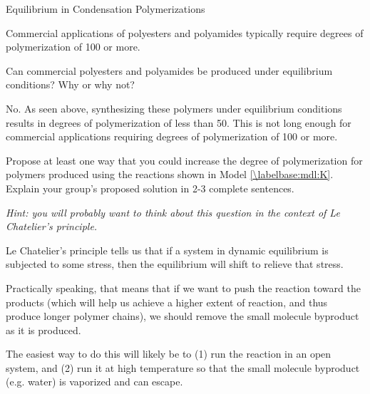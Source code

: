 \begin{activity}{Equilibrium in Condensation Polymerizations}
\begin{infobox}
	Commercial applications of polyesters and polyamides typically require degrees of polymerization of 100 or more.  

\end{infobox}

\begin{ctqs}
		
		\question Can commercial polyesters and polyamides be produced under equilibrium conditions?  Why or why not?
		
			\begin{solution}[1.5in]{}
			
				No. As seen above, synthesizing these polymers under equilibrium conditions results in degrees of polymerization of less than 50.  This is not long enough for commercial applications requiring degrees of polymerization of 100 or more.
			
			\end{solution}
			
		\question Propose at least one way that you could increase the degree of polymerization for polymers produced using the reactions shown in Model \ref{\labelbase:mdl:K}.  Explain your group's proposed solution in 2-3 complete sentences.
		
			\emph{Hint: you will probably want to think about this question in the context of Le Chatelier's principle.}
		
			\begin{solution}[2in]{}
			
				Le Chatelier's principle tells us that if a system in dynamic equilibrium is subjected to some stress, then the equilibrium will shift to relieve that stress.
				
				Practically speaking, that means that if we want to push the reaction toward the products (which will help us achieve a higher extent of reaction, and thus produce longer polymer chains), we should remove the small molecule byproduct as it is produced.
				
				The easiest way to do this will likely be to (1) run the reaction in an open system, and (2) run it at high temperature so that the small molecule byproduct (e.g. water) is vaporized and can escape.
			
			\end{solution}
		
\end{ctqs}

\clearpage
\begin{model}
\label{\labelbase:mdl:PET}


\end{model}
\end{activity}

